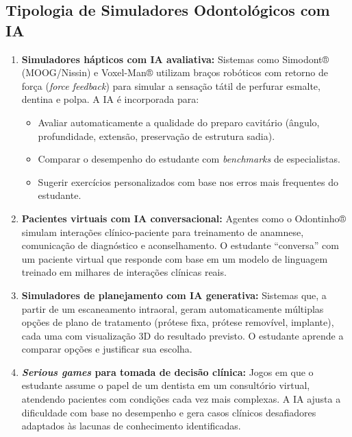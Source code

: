 
\subsection{Tipologia de Simuladores Odontológicos com IA}

\begin{enumerate}
  \item \textbf{Simuladores hápticos com IA avaliativa:} Sistemas como
    Simodont® (MOOG/Nissin) e Voxel-Man® utilizam braços robóticos com
    retorno de força (\textit{force feedback}) para simular a sensação tátil
    de perfurar esmalte, dentina e polpa. A IA é incorporada para:
    \begin{itemize}
      \item Avaliar automaticamente a qualidade do preparo cavitário (ângulo,
        profundidade, extensão, preservação de estrutura sadia).
      \item Comparar o desempenho do estudante com \textit{benchmarks} de
        especialistas.
      \item Sugerir exercícios personalizados com base nos erros mais
        frequentes do estudante.
    \end{itemize}

  \item \textbf{Pacientes virtuais com IA conversacional:} Agentes como o
    Odontinho® simulam interações clínico-paciente para treinamento de
    anamnese, comunicação de diagnóstico e aconselhamento. O estudante
    ``conversa'' com um paciente virtual que responde com base em um modelo
    de linguagem treinado em milhares de interações clínicas reais.

  \item \textbf{Simuladores de planejamento com IA generativa:} Sistemas que,
    a partir de um escaneamento intraoral, geram automaticamente múltiplas
    opções de plano de tratamento (prótese fixa, prótese removível, implante),
    cada uma com visualização 3D do resultado previsto. O estudante aprende a
    comparar opções e justificar sua escolha.

  \item \textbf{\textit{Serious games} para tomada de decisão clínica:}
    Jogos em que o estudante assume o papel de um dentista em um consultório
    virtual, atendendo pacientes com condições cada vez mais complexas. A IA
    ajusta a dificuldade com base no desempenho e gera casos clínicos
    desafiadores adaptados às lacunas de conhecimento identificadas.
\end{enumerate}

